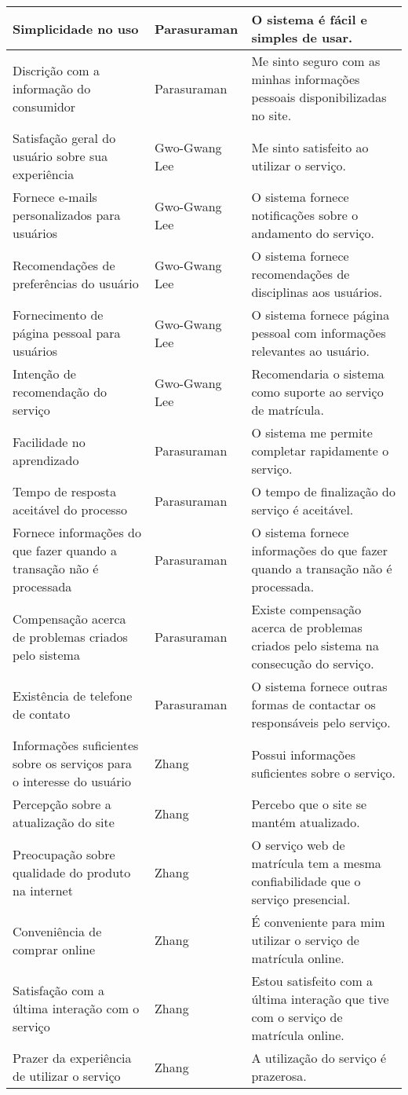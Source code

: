 \begin{apendicesenv}
\begin{table}[]
{\begin{tabular}{|l|l|l|}
Simplicidade no uso & Parasuraman & O sistema é fácil e simples de usar. \\ \hline
Discrição com a informação do consumidor & Parasuraman & Me sinto seguro com as minhas informações pessoais disponibilizadas no site. \\ \hline
Satisfação geral do usuário sobre sua experiência & Gwo-Gwang Lee & Me sinto satisfeito ao utilizar o serviço. \\ \hline
Fornece e-mails personalizados para usuários & Gwo-Gwang Lee & O sistema fornece notificações sobre o andamento do serviço. \\ \hline
Recomendações de preferências do usuário & Gwo-Gwang Lee & O sistema fornece recomendações de disciplinas aos usuários. \\ \hline
Fornecimento de página pessoal para usuários & Gwo-Gwang Lee & O sistema fornece página pessoal com informações relevantes ao usuário. \\ \hline
Intenção de recomendação do serviço & Gwo-Gwang Lee & Recomendaria o sistema como suporte ao serviço de matrícula. \\ \hline
Facilidade no aprendizado & Parasuraman & O sistema me permite completar rapidamente o serviço. \\ \hline
Tempo de resposta aceitável do processo & Parasuraman & O tempo de finalização do serviço é aceitável. \\ \hline
Fornece informações do que fazer quando a transação não é processada & Parasuraman & O sistema fornece informações do que fazer quando a transação não é processada. \\ \hline
Compensação acerca de problemas criados pelo sistema & Parasuraman & Existe compensação acerca de problemas criados pelo sistema na consecução do serviço. \\ \hline
Existência de telefone de contato & Parasuraman & O sistema fornece outras formas de contactar os responsáveis pelo serviço. \\ \hline
Informações suficientes sobre os serviços para o interesse do usuário & Zhang & Possui informações suficientes sobre o serviço. \\ \hline
Percepção sobre a atualização do site & Zhang & Percebo que o site se mantém atualizado. \\ \hline
Preocupação sobre qualidade do produto na internet & Zhang & O serviço web de matrícula tem a mesma confiabilidade que o serviço presencial. \\ \hline
Conveniência de comprar online & Zhang & É conveniente para mim utilizar o serviço de matrícula online. \\ \hline
Satisfação com a última interação com o serviço & Zhang & Estou satisfeito com a última interação que tive com o serviço de matrícula online. \\ \hline
Prazer da experiência de utilizar o serviço & Zhang & A utilização do serviço é prazerosa. \\ \hline
\end{tabular}%
}
\end{table}


\end{apendicesenv}
